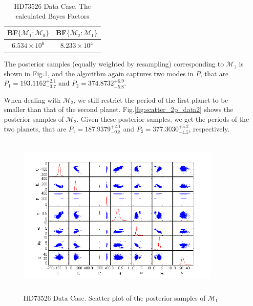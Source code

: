 \documentclass[aoas]{imsart}
\def\BF{\textsf{BF}}
\begin{document}
\begin{table}
\begin{tabular}{c|c}
 \BF$\{\mathcal{M}_1:\mathcal{M}_0\}$ & \BF$\{\mathcal{M}_2:\mathcal{M}_1\}$\\
\hline $6.534\times10^6$& $8.233\times10^4$\\
\hline
\end{tabular}
\caption{HD73526 \citep{tinney20062} Data Case. The calculated
Bayes Factors}\label{Bayes_factor_data2}
\end{table}

The posterior samples (equally weighted by resampling) corresponding
to $\mathcal{M}_1$ is shown in Fig.\ref{fig:scatter_1p_data2}, and
the algorithm again captures two modes in $P$, that are
$P_1=193.1162_{-3.7}^{+2.1}$ and $P_2=374.8732_{-5.8}^{+6.9}$.

When dealing with $\mathcal{M}_2$, we still restrict the period of
the first planet to be smaller than that of the second planet.
Fig.\ref{fig:scatter_2p_data2} shows the posterior samples of
$\mathcal{M}_2$. Given these posterior samples, we get the periods
of the two planets, that are $P_1=187.9379_{-0.8}^{+2.1}$ and
$P_2=377.3030_{-4.5}^{+5.2}$, respectively.
\begin{figure}[!htb]
\centerline{\includegraphics[width=4in,height=3.2in]{Fig/scatter_1p_data2.png}}
\caption{HD73526 \citep{tinney20062} Data Case. Scatter plot of the
posterior samples of $\mathcal{M}_1$}\label{fig:scatter_1p_data2}
\end{figure}
\end{document}
